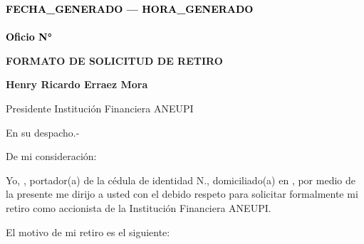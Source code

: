 \documentclass[a4paper,12pt]{article}
\begin{document}
\pagestyle{empty}

\vspace*{-5.5cm}
\begin{flushright}
{\footnotesize \textcolor{black}{\textbf{{{FECHA_GENERADO}} --- {{{HORA_GENERADO}}}}}} \\[-10pt] %
{\footnotesize \textcolor{black}{\underline{\hspace{7.5cm}}}} \\[-2pt] %
{\footnotesize \textcolor{black}{\textbf{Oficio N° }}} 
\end{flushright}


\vspace{2.5cm}
\noindent
\hspace*{\dimexpr\textwidth+1cm\relax}



\begin{center}
    \textbf{\large FORMATO DE SOLICITUD DE RETIRO}
\end{center}

\vspace{0.8cm}

\noindent \textbf{Henry Ricardo Erraez Mora} 

\noindent Presidente Institución Financiera ANEUPI 

\noindent En su despacho.-

\vspace{1cm}

\noindent De mi consideración:

\noindent Yo, \textbf{\underline{\hspace{6cm}}}, portador(a) de la cédula de identidad N.\textbf{\underline{\hspace{4cm}}}, domiciliado(a) en \textbf{\underline{\hspace{8cm}}}, por medio de la presente me dirijo a usted con el debido respeto para solicitar formalmente mi retiro como accionista de la Institución Financiera ANEUPI.

\vspace{0.5cm}

\noindent El motivo de mi retiro es el siguiente:

\vspace{0.3cm}

\noindent \textbf{\underline{\hspace{16cm}}}

\vspace{0.5cm}
\end{document}
